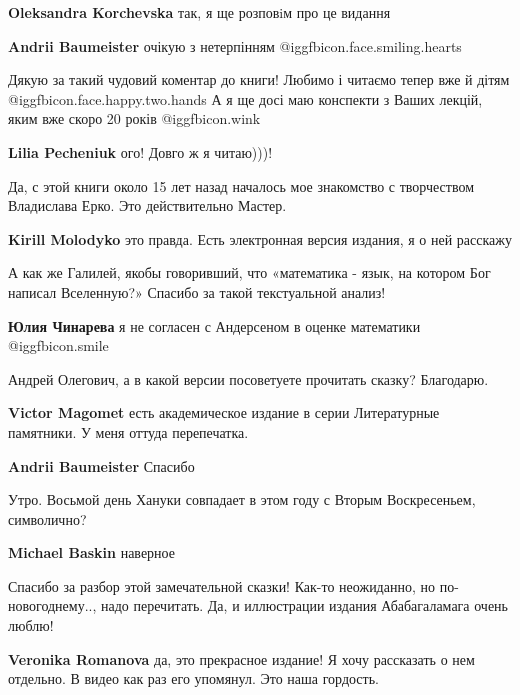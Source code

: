 \begin{itemize}
\begin{itemize} %
\textbf{Oleksandra Korchevska} так, я ще розповiм про це видання

\textbf{Andrii Baumeister} очікую з нетерпінням  @igg{fbicon.face.smiling.hearts} 
\end{itemize} %


Дякую за такий чудовий коментар до книги! Любимо і читаємо тепер вже й дітям  @igg{fbicon.face.happy.two.hands} 
А я ще досі маю конспекти з Ваших лекцій, яким вже скоро 20 років @igg{fbicon.wink} 

\textbf{Lilia Pecheniuk} ого! Довго ж я читаю)))!

Да, с этой книги около 15 лет назад началось мое знакомство с творчеством Владислава Ерко. Это действительно Мастер.


\textbf{Kirill Molodyko} это правда. Есть электронная версия издания, я о ней расскажу


А как же Галилей, якобы говоривший, что «математика - язык, на котором Бог
написал Вселенную?» Спасибо за такой текстуальной анализ!

\textbf{Юлия Чинарева} я не согласен с Андерсеном в оценке математики  @igg{fbicon.smile} 

Андрей Олегович, а в какой версии посоветуете прочитать сказку? Благодарю.

\begin{itemize} %
\textbf{Victor Magomet} есть академическое издание в серии Литературные памятники. У меня оттуда перепечатка.

\textbf{Andrii Baumeister} Спасибо
\end{itemize} %

Утро. Восьмой день Хануки совпадает в этом году с Вторым Воскресеньем, символично?


\textbf{Michael Baskin} наверное

Спасибо за разбор этой замечательной сказки! Как-то неожиданно, но по-новогоднему.., надо перечитать.
Да, и иллюстрации издания Абабагаламага очень люблю!


\textbf{Veronika Romanova} да, это прекрасное издание! Я хочу рассказать о нем отдельно. В видео как раз его упомянул. Это наша гордость.


\end{itemize}
